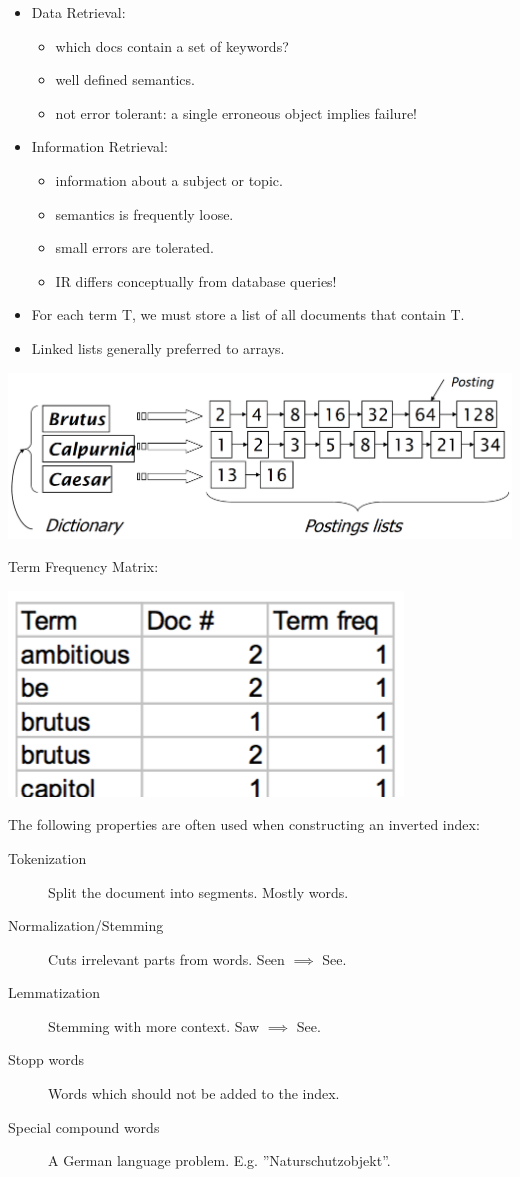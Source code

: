 \begin{breakbox}
\begin{itemize}
	\item Data Retrieval:
		\begin{itemize}
			\item which docs contain a set of keywords?
			\item well defined semantics.
			\item not error tolerant: a single erroneous object implies failure!
		\end{itemize}
	\item Information Retrieval:
		\begin{itemize}
			\item information about a subject or topic.
			\item semantics is frequently loose.
			\item small errors are tolerated.
			\item IR differs conceptually from database queries!
		\end{itemize}
\end{itemize}
\end{breakbox}

\begin{breakbox}
\begin{itemize}
	\item For each term T, we must store a list of all documents that contain T.
	\item Linked lists generally preferred to arrays.
\end{itemize}
\begin{center}
\includegraphics[width=.15\textwidth]{slides_images/inverted_index}
\end{center}
Term Frequency Matrix:
\begin{center}
\includegraphics[width=.05\textwidth]{slides_images/term_frequency_matrix}
\end{center}
The following properties are often used when constructing an inverted index:
\begin{description}
	\item[Tokenization] Split the document into segments. Mostly words.
	\item[Normalization/Stemming] Cuts irrelevant parts from words. Seen $\implies$ See.
	\item[Lemmatization] Stemming with more context. Saw $\implies$ See.
	\item[Stopp words] Words which should not be added to the index.
	\item[Special compound words] A German language problem. E.g. ''Naturschutzobjekt''.
\end{description}
\end{breakbox}

